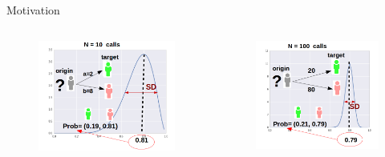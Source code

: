 \documentclass{beamer}
\begin{document}
\begin{frame}{Motivation}

\begin{columns}
\begin{column}{0.49\textwidth}

\begin{figure}[h]
\begin{center}
\includegraphics[width=\columnwidth]{distribucion1.png}
\end{center}
\end{figure}
\end{column}

\begin{column}{0.49\textwidth}

\begin{figure}[h]
\begin{center}
\includegraphics[width=\columnwidth]{distribucion2.png}
\end{center}
\end{figure}


\end{column}
\end{columns}
\end{frame}
\end{document}
